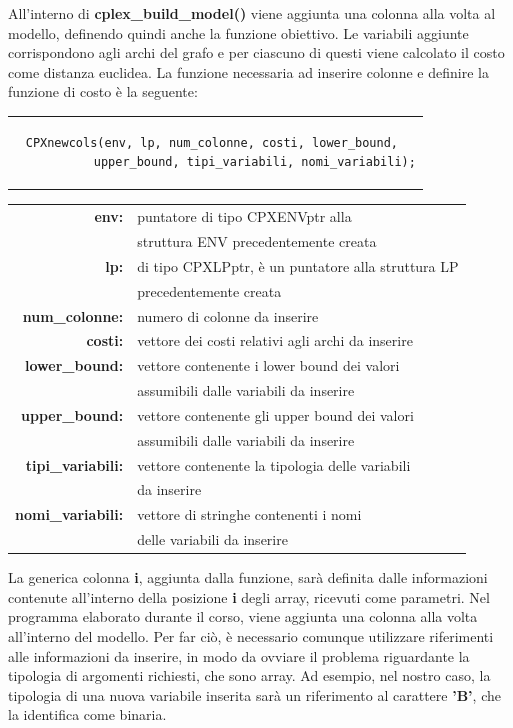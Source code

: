 All'interno di \textbf{cplex\_build\_model()} viene aggiunta una colonna alla volta al modello, definendo quindi anche la funzione obiettivo. Le variabili aggiunte corrispondono agli archi del grafo e per ciascuno di questi viene calcolato il costo come distanza euclidea. La funzione necessaria ad inserire colonne e definire la funzione di costo è la seguente:
\vspace{0.5cm}
\begin{center}
\begin{tabular}{c}
\begin{lstlisting}[linewidth=350pt, basicstyle=\footnotesize\sffamily,]     
CPXnewcols(env, lp, num_colonne, costi, lower_bound, 
           upper_bound, tipi_variabili, nomi_variabili);
\end{lstlisting}
\end{tabular}
\end{center}
\begin{table}[h]
\begin{tabular}{rl}
\textbf{env:} & {puntatore di tipo CPXENVptr alla}\\
& {struttura ENV precedentemente creata} \\
\textbf{lp:} & {di tipo CPXLPptr, è un puntatore alla struttura LP}\\
& {precedentemente creata}\\
\textbf{num\_colonne:} & {numero di colonne da inserire} \\    
\textbf{costi:} & {vettore dei costi relativi agli archi da inserire} \\
\textbf{lower\_bound:} & {vettore contenente i lower bound dei valori}\\
& {assumibili dalle variabili da inserire}\\              
\textbf{upper\_bound:} & {vettore contenente gli upper bound dei valori}\\
&  {assumibili dalle variabili da inserire} \\
\textbf{tipi\_variabili:} & {vettore contenente la tipologia delle variabili}\\
& da inserire\\
\textbf{nomi\_variabili:} & {vettore di stringhe contenenti i nomi}\\
& {delle variabili da inserire}
\end{tabular}
\end{table}
La generica colonna \textbf{i}, aggiunta dalla funzione, sarà definita dalle informazioni contenute all'interno della posizione \textbf{i} degli array, ricevuti come parametri. Nel programma elaborato durante il corso, viene aggiunta una colonna alla volta all'interno del modello. Per far ciò, è necessario comunque utilizzare riferimenti alle informazioni da inserire, in modo da ovviare il problema riguardante la tipologia di argomenti richiesti, che sono array. Ad esempio, nel nostro caso, la tipologia di una nuova variabile inserita sarà un riferimento al carattere \textbf{'B'}, che la identifica come binaria.\\
